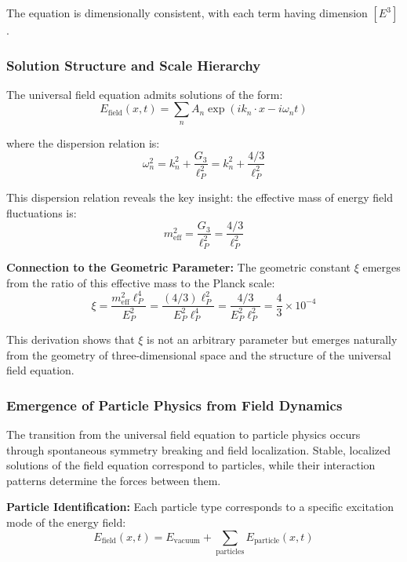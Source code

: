 \documentclass[12pt,a4paper]{article}
\newcommand{\xigeom}{\xi}
\newcommand{\Efield}{E_{\text{field}}}
\begin{document}
	The equation is dimensionally consistent, with each term having dimension $[E^3]$.
	
	\subsubsection{Solution Structure and Scale Hierarchy}
	
	The universal field equation admits solutions of the form:
	\begin{equation}
		\Efield(x,t) = \sum_n A_n \exp(ik_n \cdot x - i\omega_n t)
	\end{equation}
	
	where the dispersion relation is:
	\begin{equation}
		\omega_n^2 = k_n^2 + \frac{G_3}{\ell_P^2} = k_n^2 + \frac{4/3}{\ell_P^2}
	\end{equation}
	
	This dispersion relation reveals the key insight: the effective mass of energy field fluctuations is:
	\begin{equation}
		m_{\text{eff}}^2 = \frac{G_3}{\ell_P^2} = \frac{4/3}{\ell_P^2}
	\end{equation}
	
	\textbf{Connection to the Geometric Parameter:} The geometric constant $\xigeom$ emerges from the ratio of this effective mass to the Planck scale:
	\begin{equation}
		\xigeom = \frac{m_{\text{eff}}^2 \ell_P^4}{E_P^2} = \frac{(4/3) \ell_P^2}{E_P^2 \ell_P^4} = \frac{4/3}{E_P^2 \ell_P^2} = \frac{4}{3} \times 10^{-4}
	\end{equation}
	
	This derivation shows that $\xigeom$ is not an arbitrary parameter but emerges naturally from the geometry of three-dimensional space and the structure of the universal field equation.
	
	\subsubsection{Emergence of Particle Physics from Field Dynamics}
	
	The transition from the universal field equation to particle physics occurs through spontaneous symmetry breaking and field localization. Stable, localized solutions of the field equation correspond to particles, while their interaction patterns determine the forces between them.
	
	\textbf{Particle Identification:} Each particle type corresponds to a specific excitation mode of the energy field:
	\begin{equation}
		\Efield(x,t) = E_{\text{vacuum}} + \sum_{\text{particles}} E_{\text{particle}}(x,t)
	\end{equation}
	
\end{document}
